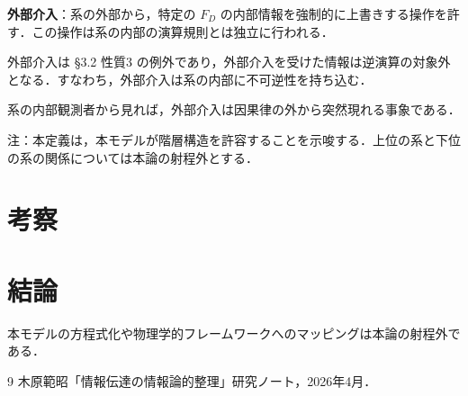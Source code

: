 \documentclass[12pt,a4paper]{ltjsarticle}
\begin{document}
\textbf{外部介入}：系の外部から，特定の $F_D$ の内部情報を強制的に上書きする操作を許す．この操作は系の内部の演算規則とは独立に行われる．

外部介入は \S 3.2 性質3 の例外であり，外部介入を受けた情報は逆演算の対象外となる．すなわち，外部介入は系の内部に不可逆性を持ち込む．

系の内部観測者から見れば，外部介入は因果律の外から突然現れる事象である．

注：本定義は，本モデルが階層構造を許容することを示唆する．上位の系と下位の系の関係については本論の射程外とする．

\section{考察}

\section{結論}

本モデルの方程式化や物理学的フレームワークへのマッピングは本論の射程外である．

\begin{thebibliography}{9}
 木原範昭「情報伝達の情報論的整理」研究ノート，2026年4月．
\end{thebibliography}
\end{document}
